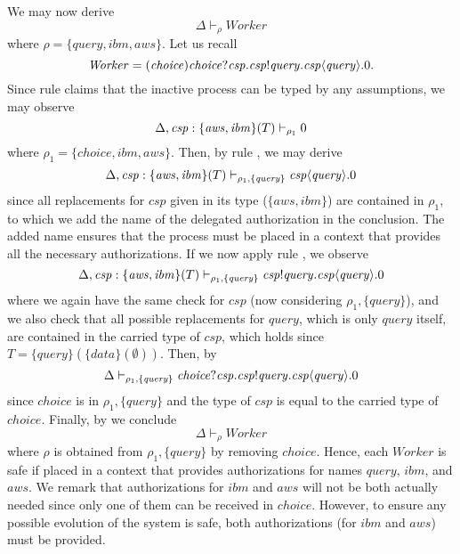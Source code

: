 We may now derive
%
$$\Delta \vdash_\rho \mathit{Worker}$$
%
where $\rho=\{\mathit{query}, \mathit{ibm}, \mathit{aws}\}$.
Let us recall  
%
$$\mathit{Worker}= (\mathit{choice}) \mathit{choice}?\mathit{csp}. {\mathit{csp}}!\mathit{query}. \mathit{csp}\langle\mathit{query}\rangle.0.$$
%
Since rule  claims that the inactive process can be typed by any assumptions, we may observe
%
$$\Delta, \mathit{csp}:\{\mathit{aws}, \mathit{ibm}\}(T) \vdash_{\rho_1} 0$$
%
where $\rho_1=\{\mathit{choice}, \mathit{ibm}, \mathit{aws}\}$. 
Then, by rule , we may derive
%
$$\Delta, \mathit{csp}:\{\mathit{aws}, \mathit{ibm}\}(T) \vdash_{\rho_1, \{\mathit{query}\}} \mathit{csp}\langle\mathit{query}\rangle.0$$
%
since all replacements for $\mathit{csp}$ given in its type ($\{\mathit{aws}, \mathit{ibm}\}$) are contained in $\rho_1$,
to which we add the name of the delegated authorization in the conclusion. %
The added name ensures that the process must be placed in 
a context that provides all the necessary authorizations.
If we now apply rule , we observe
%
$$\Delta, \mathit{csp}:\{\mathit{aws}, \mathit{ibm}\}(T) \vdash_{\rho_1, \{\mathit{query}\}} {\mathit{csp}}!\mathit{query}.\mathit{csp}\langle\mathit{query}\rangle.0$$
%
where we again have the same check for $\mathit{csp}$ 
(now considering $\rho_1,\{\mathit{query}\}$), 
and we also check that all possible replacements for 
$\mathit{query}$, which is only $\mathit{query}$ itself, are contained in the carried type of 
$\mathit{csp}$, which holds since $T=\{\mathit{query}\}(\{\mathit{data}\}(\emptyset))$. 
Then, by  
%
$$\Delta \vdash_{\rho_1, \{\mathit{query}\}} \mathit{choice}?\mathit{csp}.{\mathit{csp}}!\mathit{query}.\mathit{csp}\langle\mathit{query}\rangle.0$$
%
since $\mathit{choice}$ is in $\rho_1,\{\mathit{query}\}$ 
and the type of $\mathit{csp}$ is 
equal to the carried type of $\mathit{choice}$.
Finally, by  we conclude
%
$$\Delta \vdash_\rho \mathit{Worker}$$
%
where $\rho$ is obtained from $\rho_1,\{\mathit{query}\}$ by removing $\mathit{choice}$.
Hence, each $\mathit{Worker}$ is safe if placed in a context
that provides authorizations for names $\mathit{query}$, $\mathit{ibm}$, and $\mathit{aws}$.
We remark that authorizations for $\mathit{ibm}$ and $\mathit{aws}$ will not be both actually needed since only one of them can be received in $\mathit{choice}$. However, to ensure any possible evolution of
the system is safe, both authorizations (for $\mathit{ibm}$ and $\mathit{aws}$) must be
 provided.



